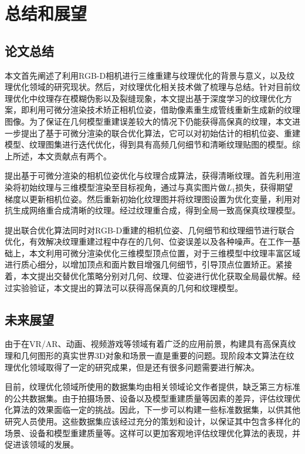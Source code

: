 

\chapter{总结和展望}

\section{论文总结}


本文首先阐述了利用RGB-D相机进行三维重建与纹理优化的背景与意义，以及纹理优化领域的研究现状。然后，对纹理优化相关技术做了梳理与总结。针对目前纹理优化中纹理存在模糊伪影以及裂缝现象，本文提出基于深度学习的纹理优化方案，即利用可微分渲染技术矫正相机位姿，借助像素重生成管线重新生成新的纹理图像。为了保证在几何模型重建误差较大的情况下仍能获得高保真的纹理，本文进一步提出了基于可微分渲染的联合优化算法，它可以对初始估计的相机位姿、重建模型、纹理图集进行迭代优化，得到具有高频几何细节和清晰纹理贴图的模型。综上所述，本文贡献点有两个。\par
提出基于可微分渲染的相机位姿优化与纹理合成算法，获得清晰纹理。首先利用渲染将初始纹理与三维模型渲染至目标视角，通过与真实图片做$L_1$损失，获得期望梯度以更新相机位姿。然后重新初始化纹理图并将纹理图设置为优化变量，利用对抗生成网络重合成清晰的纹理。经过纹理重合成，得到全局一致高保真纹理模型。\par
提出联合优化算法同时对RGB-D重建的相机位姿、几何细节和纹理细节进行联合优化，有效解决纹理重建过程中存在的几何、位姿误差以及各种噪声。在工作一基础上，本文利用可微分渲染优化三维模型顶点位置，对于三维模型中纹理丰富区域进行质心细分，以增加顶点和面片数目增强几何细节，引导顶点位置矫正。紧接着，本文提出交替优化策略分别对几何、纹理、位姿进行优化获取全局最优解。经过实验验证，本文提出的算法可以获得高保真的几何和纹理模型。
\section{未来展望}
由于在VR/AR、动画、视频游戏等领域有着广泛的应用前景，构建具有高保真纹理和几何图形的真实世界3D对象和场景一直是重要的问题。现阶段本文算法在纹理优化领域取得了一定的研究成果，但是还有很多问题需要进行解决。\par
目前，纹理优化领域所使用的数据集均由相关领域论文作者提供，缺乏第三方标准的公共数据集。由于拍摄场景、设备以及模型重建质量等因素的差异，评估纹理优化算法的效果面临一定的挑战。因此，下一步可以构建一些标准数据集，以供其他研究人员使用。这些数据集应该经过充分的策划和设计，以保证其中包含多样化的场景、设备和模型重建质量等。这样可以更加客观地评估纹理优化算法的表现，并促进该领域的发展。\par

